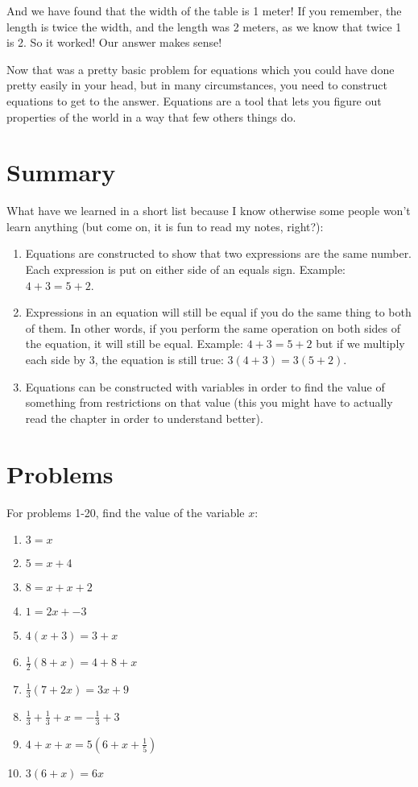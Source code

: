 \documentclass{article}
\begin{document}
And we have found that the width of the table is 1 meter! If you remember, the length is twice the width, and the length was 2 meters, as we know that twice 1 is 2. So it worked! Our answer makes sense!

Now that was a pretty basic problem for equations which you could have done pretty easily in your head, but in many circumstances, you need to construct equations to get to the answer. Equations are a tool that lets you figure out properties of the world in a way that few others things do. 

\section*{Summary}
What have we learned in a short list because I know otherwise some people won't learn anything (but come on, it is fun to read my notes, right?): 
\begin{enumerate}
    \item Equations are constructed to show that two expressions are the same number. Each expression is put on either side of an equals sign. Example: $4+3 = 5+2$. 
    \item Expressions in an equation will still be equal if you do the same thing to both of them. In other words, if you perform the same operation on both sides of the equation, it will still be equal. Example: $4+3 = 5+2$ but if we multiply each side by 3, the equation is still true: $3(4+3) = 3(5+2)$.
    \item Equations can be constructed with variables in order to find the value of something from restrictions on that value (this you might have to actually read the chapter in order to understand better). 
\end{enumerate}

\newpage
\section*{Problems}
\begin{multicols*}{2}
    For problems 1-20, find the value of the variable $x$: 
    \begin{enumerate}
        \item $3 = x$ 
        \item $5 = x + 4 $
        \item $8 = x + x + 2$
        \item $1 = 2x + -3$
        \item $4(x + 3) = 3 + x$
        \item $\frac{1}{2} (8 + x) = 4 + 8 + x$ 
        \item $\frac{1}{3} ( 7 + 2x) = 3x + 9$
        \item $ \frac{1}{3} + \frac{1}{3} + x = -\frac{1}{3} + 3$
        \item $ 4 + x + x = 5(6 + x + \frac{1}{5}) $
        \item $ 3(6 + x) = 6x  $
    \end{enumerate}
\end{multicols*}
\end{document}
